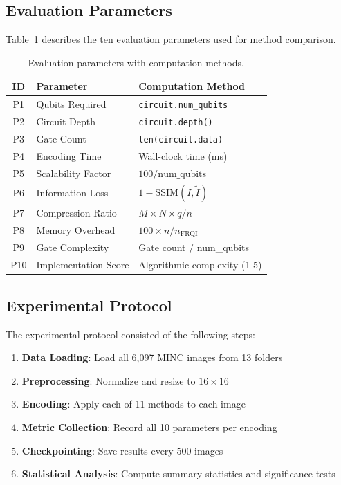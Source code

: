 \documentclass[pdflatex,sn-mathphys-num,Numbered]{sn-jnl}
\theoremstyle{thmstyleone}
\theoremstyle{thmstyletwo}
\theoremstyle{thmstylethree}
\begin{document}
\subsection{Evaluation Parameters}

Table~\ref{tab:eval_params} describes the ten evaluation parameters used for method comparison.

\begin{table}[h!]
\caption{Evaluation parameters with computation methods.}
\label{tab:eval_params}
\centering
\begin{tabular}{@{}clp{6cm}@{}}
\toprule
ID & Parameter & Computation Method \\
\midrule
P1 & Qubits Required & \texttt{circuit.num\_qubits} \\
P2 & Circuit Depth & \texttt{circuit.depth()} \\
P3 & Gate Count & \texttt{len(circuit.data)} \\
P4 & Encoding Time & Wall-clock time (ms) \\
P5 & Scalability Factor & $100 / \text{num\_qubits}$ \\
P6 & Information Loss & $1 - \text{SSIM}(I, \tilde{I})$ \\
P7 & Compression Ratio & $M \times N \times q / n$ \\
P8 & Memory Overhead & $100 \times n / n_{\text{FRQI}}$ \\
P9 & Gate Complexity & Gate count / num\_qubits \\
P10 & Implementation Score & Algorithmic complexity (1-5) \\
\bottomrule
\end{tabular}
\end{table}

\subsection{Experimental Protocol}

The experimental protocol consisted of the following steps:

\begin{enumerate}
\item \textbf{Data Loading}: Load all 6,097 MINC images from 13 folders
\item \textbf{Preprocessing}: Normalize and resize to $16 \times 16$
\item \textbf{Encoding}: Apply each of 11 methods to each image
\item \textbf{Metric Collection}: Record all 10 parameters per encoding
\item \textbf{Checkpointing}: Save results every 500 images
\item \textbf{Statistical Analysis}: Compute summary statistics and significance tests
\end{enumerate}
\end{document}
